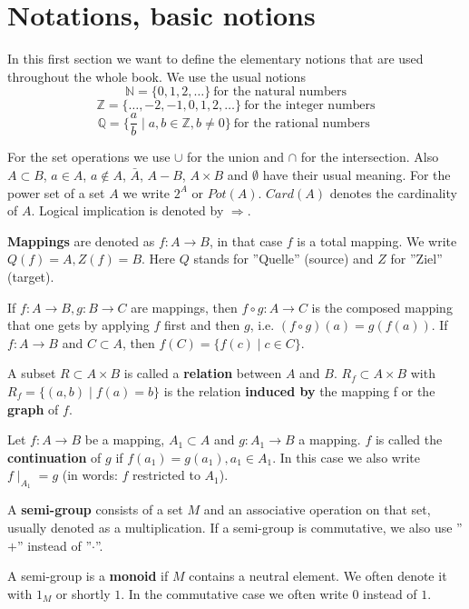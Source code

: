 \section{Notations, basic notions}

In this first section we want to define the elementary notions that are used
throughout the whole book. We use the usual notions
\[ \mathbb{N} = \{ 0, 1, 2, \ldots \}\ \mbox{for the natural numbers} \]
\[ \mathbb{Z} = \{ \ldots, -2, -1, 0, 1, 2, \ldots \}\ \mbox{for the integer
numbers} \]
\[ \mathbb{Q} = \{ \frac{a}{b} \mid a,b \in \mathbb{Z}, b \neq 0 \}\ \mbox{for
the rational numbers } \]

For the set operations we use $\cup$ for the union and $\cap$ for the
intersection. Also $A \subset B$, $a \in A$, $a \not\in A$, $\bar{A}$, $A - B$,
$A \times B$ and $\emptyset$ have their usual meaning. For the power set of a
set $A$ we write $2^A$ or $Pot(A)$. $Card(A)$ denotes the cardinality of $A$.
Logical implication is denoted by $\Rightarrow$.

{\bf Mappings} are denoted as $f : A \rightarrow B$, in that case $f$ is a
total mapping. We write $Q(f) = A, Z(f) = B$. Here $Q$ stands for ''Quelle'' (source)
and $Z$ for ''Ziel'' (target).

If $f: A \rightarrow B, g : B \rightarrow C$ are mappings, then $f \circ g : A
\rightarrow C$ is the composed mapping that one gets by applying $f$ first
and then $g$, i.e. $(f \circ g)(a) = g(f(a))$. If $f:A \rightarrow B$ and $C
\subset A$, then $f(C) = \{ f(c) \mid c \in C \}$.

A subset $R \subset A \times B$ is called a {\bf relation} between $A$ and $B$.
$R_f \subset A \times B$ with $R_f = \{ (a,b) \mid f(a) = b \}$ is the relation
{\bf induced by} the mapping f or the {\bf graph} of $f$.

Let $f : A \rightarrow B$ be a mapping, $A_1 \subset A$ and $g : A_1 \rightarrow
B$ a mapping. $f$ is called the {\bf continuation} of $g$ if $f(a_1) = g(a_1),
a_1 \in A_1$. In this case we also write $f \mid _{A_1} = g$ (in words: $f$
restricted to $A_1$).

A {\bf semi-group} consists of a set $M$ and an associative operation on that
set, usually denoted as a multiplication. If a semi-group is commutative, we
also use ''$+$'' instead of ''$\cdot$''.

A semi-group is a {\bf monoid} if $M$ contains a neutral element. We often
denote it with $1_M$ or shortly $1$. In the commutative case we often write $0$
instead of $1$.

